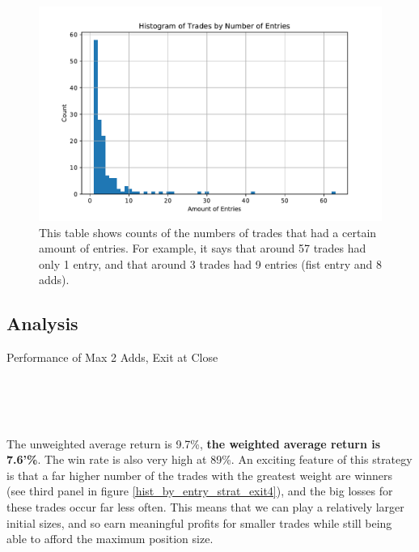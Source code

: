 \documentclass{article}
\begin{document}
	\begin{figure}
	\includegraphics[width=\textwidth]{prog_entry_exit4_hist.pdf}
	\caption{This table shows counts of the numbers of trades that had a certain amount of entries. For example, it says that around 57 trades had only 1 entry, and that around 3 trades had 9 entries (fist entry and 8 adds).}
	\label{hist_strat_exit4}
	\end{figure}

\subsection{Analysis}

	\begin{table}
\caption{Performance of Max 2 Adds, Exit at Close}
\\[2ex]


\\[2ex]


\\[2ex]

\label{tab_strat_lim3_exit4}
\end{table}

The unweighted average return is 9.7\%, \textbf{the weighted average return is 7.6'\%}. The win rate is also very high at 89\%. An exciting feature of this strategy is that a far higher number of the trades with the greatest weight are winners (see third panel in figure \ref{hist_by_entry_strat_exit4}), and the big losses for these trades occur far less often. This means that we can play a relatively larger initial sizes, and so earn meaningful profits for smaller trades while still being able to afford the maximum position size.   
\end{document}
